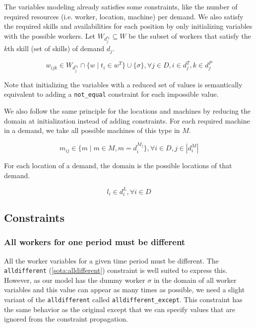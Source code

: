 \documentclass[../../thesis.tex]{subfiles}
\begin{document}
The variables modeling already satisfies some constraints, like the number of required resources (i.e. worker, location, machine)
per demand. We also satisfy the required skills and availabilities for each position by only initializing variables with the 
possible workers. Let $W_{d^{s_k}_j} \subseteq W$ be the subset of workers that satisfy the $k$th skill (set of skills) of demand $d_j$.

\begin{equation}
  \label{wdomain}
  w_{ijk} \in W_{d^{s_k}_j} \cap \{ w \mid t_i \in w^T \} \cup \{ \sigma \}, \forall j \in D, i \in d^T_j, k \in d^P_j
\end{equation}

Note that initializing the variables with a reduced set of values is semantically equivalent to adding a \texttt{not\_equal} constraint for each impossible value.


We also follow the same principle for the locations and machines by reducing the domain at initialization instead of adding constraints.
For each required machine in a demand, we take all possible machines of this type in $M$.

\begin{equation}
  \label{mdomain}
  m_{ij} \in \{ m \mid m \in M, m = d_i^{M_j}  \}, \forall i \in D, j \in |d_i^M|
\end{equation}

For each location of a demand, the domain is the possible locations of that demand.

\begin{equation}
  \label{ldomain}
  l_i \in d_i^L, \forall i \in D
\end{equation}


\subsection{Constraints}

\subsubsection{All workers for one period must be different}

All the worker variables for a given time period must be different. 
The \texttt{alldifferent} (\autoref{sota:alldifferent}) constraint is well suited to express this. 
However, as our model has the dummy worker $\sigma$ in the domain of all worker variables and this value 
can appear as many times as possible, we need a slight variant of the \texttt{alldifferent} called \texttt{alldifferent\_except}. 
This constraint has the same behavior as the original except that we can specify values that are ignored from 
the constraint propagation.
\end{document}
